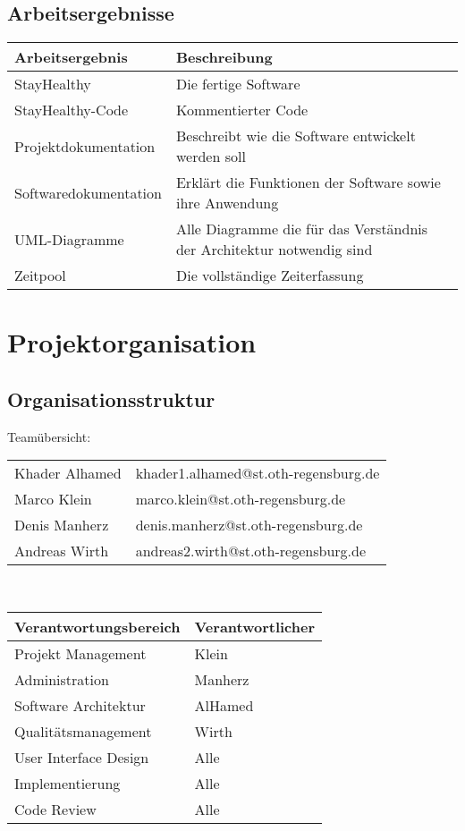 \documentclass[12pt,a4paper,onecolumn]{article}
\begin{document}
\subsection{Arbeitsergebnisse}
\begin{tabularx}{\textwidth}{ |l|X| } 
 \hline
\textbf{Arbeitsergebnis}  & \textbf{Beschreibung}\\ 
 \hline
 StayHealthy & Die fertige Software\\ 
 \hline
 StayHealthy-Code & Kommentierter Code\\
 \hline
 Projektdokumentation & Beschreibt wie die Software entwickelt werden soll\\
 \hline
 Softwaredokumentation & Erklärt die Funktionen der Software sowie ihre Anwendung\\
 \hline
 UML-Diagramme & Alle Diagramme die für das Verständnis der Architektur notwendig sind \\ 
 \hline
 Zeitpool & Die vollständige Zeiterfassung\\
 \hline
\end{tabularx}

\section{Projektorganisation}

\subsection{Organisationsstruktur}
Teamübersicht:
\vspace{0.2cm}\\
\begin{tabularx}{\textwidth}{l X}
Khader Alhamed & khader1.alhamed@st.oth-regensburg.de\\
Marco Klein & marco.klein@st.oth-regensburg.de\\
Denis Manherz & denis.manherz@st.oth-regensburg.de\\
Andreas Wirth & andreas2.wirth@st.oth-regensburg.de\\
\end{tabularx}
\vspace{0.2cm}\\
\begin{tabular}{|l|l|}
\hline
     \textbf{Verantwortungsbereich} & \textbf{Verantwortlicher}\\
     \hline
     Projekt Management & Klein\\
     \hline
     Administration &  Manherz\\
     \hline 
     Software Architektur & AlHamed \\
     \hline
     Qualitätsmanagement & Wirth\\
     \hline
     User Interface Design & Alle\\
     \hline
     Implementierung & Alle\\
     \hline
     Code Review & Alle\\
     \hline
\end{tabular}
\end{document}
